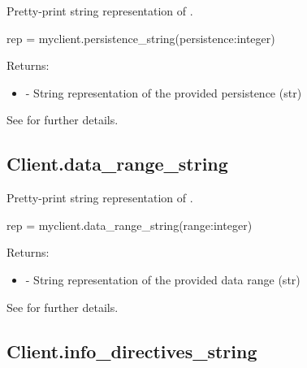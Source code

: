 \summary

Pretty-print string representation of .

\format

\pyspecificstart
\begin{codepar}
rep = myclient.persistence_string(persistence:integer)
\end{codepar}
\pyspecificend

\begin{arglist}
\end{arglist}

Returns:
\begin{itemize}
    \item {} - String representation of the provided persistence (str)
\end{itemize}

See  for further details.


\subsection{Client.data_range_string}

\summary

Pretty-print string representation of .

\format

\pyspecificstart
\begin{codepar}
rep = myclient.data_range_string(range:integer)
\end{codepar}
\pyspecificend

\begin{arglist}
\end{arglist}

Returns:
\begin{itemize}
    \item {} - String representation of the provided data range (str)
\end{itemize}

See  for further details.


\subsection{Client.info_directives_string}

